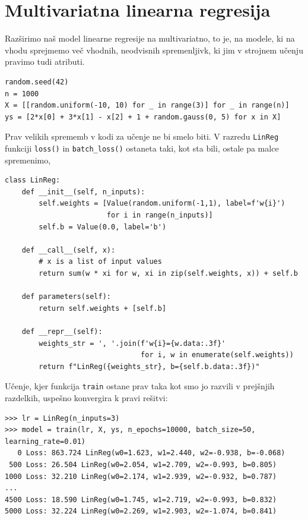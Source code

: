 \section{Multivariatna linearna regresija}

Razširimo naš model linearne regresije na multivariatno, to je, na modele, ki na vhodu sprejmemo več vhodnih, neodvisnih spremenljivk, ki jim v strojnem učenju pravimo tudi atributi. 

\vspace*{3mm}
\begin{lstlisting}
random.seed(42)
n = 1000
X = [[random.uniform(-10, 10) for _ in range(3)] for _ in range(n)]
ys = [2*x[0] + 3*x[1] - x[2] + 1 + random.gauss(0, 5) for x in X]
\end{lstlisting}

Prav velikih sprememb v kodi za učenje ne bi smelo biti. V razredu \texttt{LinReg} funkciji \texttt{loss()} in \texttt{batch\_loss()} ostaneta taki, kot sta bili, ostale pa malce spremenimo, 

\vspace*{3mm}
\begin{lstlisting}
class LinReg:
    def __init__(self, n_inputs):
        self.weights = [Value(random.uniform(-1,1), label=f'w{i}') 
                        for i in range(n_inputs)]
        self.b = Value(0.0, label='b')

    def __call__(self, x):
        # x is a list of input values
        return sum(w * xi for w, xi in zip(self.weights, x)) + self.b

    def parameters(self):
        return self.weights + [self.b]

    def __repr__(self):
        weights_str = ', '.join(f'w{i}={w.data:.3f}' 
                                for i, w in enumerate(self.weights))
        return f"LinReg({weights_str}, b={self.b.data:.3f})"
\end{lstlisting}

Učenje, kjer funkcija \texttt{train} ostane prav taka kot smo jo razvili v prejšnjih razdelkih, uspešno konvergira k pravi rešitvi:

\vspace*{3mm}
\begin{lstlisting}
>>> lr = LinReg(n_inputs=3)
>>> model = train(lr, X, ys, n_epochs=10000, batch_size=50, learning_rate=0.01)
   0 Loss: 863.724 LinReg(w0=1.623, w1=2.440, w2=-0.938, b=-0.068)
 500 Loss: 26.504 LinReg(w0=2.054, w1=2.709, w2=-0.993, b=0.805)
1000 Loss: 32.210 LinReg(w0=2.174, w1=2.939, w2=-0.932, b=0.787)
...
4500 Loss: 18.590 LinReg(w0=1.745, w1=2.719, w2=-0.993, b=0.832)
5000 Loss: 32.224 LinReg(w0=2.269, w1=2.903, w2=-1.074, b=0.841)
\end{lstlisting}

